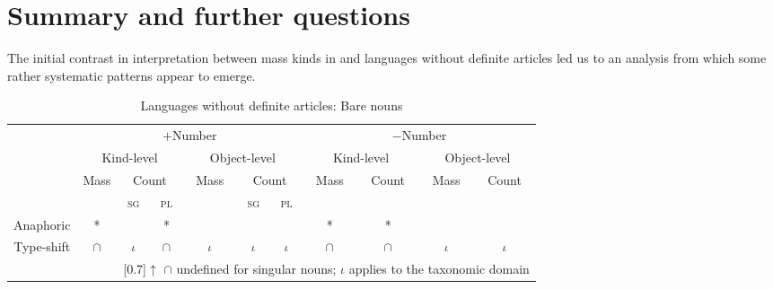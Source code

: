 \documentclass[output=paper,
modfonts
]{langscibook}
\begin{document}
	\section{Summary and further questions} \label{sec:despic:5} 
	
	The initial contrast in interpretation between mass kinds in  and languages without
	definite articles led us to an analysis from which some rather systematic patterns appear to emerge.
	
	\begin{table} 
		\caption{Languages without definite articles: Bare nouns}
		\begin{tabular}{c|c|c|c|c|c|c|c|c|c|c|}
			\cline{2-11}
			& \multicolumn{6}{|c|}{$+${\footnotesize Number}} & \multicolumn{4}{|c|}{$-${\footnotesize Number}} \\
			\cline{2-11}
			& 
			\multicolumn{3}{|c|}{{{\footnotesize Kind-level}}} & \multicolumn{3}{|c|}{{{\footnotesize Object-level}}} & \multicolumn{2}{|c|}{{{\footnotesize Kind-level}}} & \multicolumn{2}{|c|}{{{\footnotesize Object-level}}} \\
			\cline{2-11}
			& \footnotesize Mass & \multicolumn{2}{|c|}{\footnotesize Count} & \footnotesize Mass & \multicolumn{2}{|c|}{\footnotesize Count} & \footnotesize Mass & \footnotesize Count & \footnotesize Mass & \footnotesize Count \\
			\cline{2-11}
			& \cellcolor{lightgray} & \cellcolor{gray}\textsc{sg} & \textsc{pl} & \cellcolor{lightgray} & \textsc{sg} & \textsc{pl} & \cellcolor{lightgray} & \cellcolor{lightgray} & \cellcolor{lightgray} & \cellcolor{lightgray} \\
			
			\hline
			\multicolumn{1}{|c|}{\footnotesize {Anaphoric}} & * & \cellcolor{gray}\checkmark & * & \checkmark & \checkmark & \checkmark & * & * & \checkmark & \checkmark \\
			
			\hline
			\multicolumn{1}{|c|}{\footnotesize {Type-shift}} & $\cap$ & \cellcolor{gray}$\iota$ & $\cap$ & $\iota$  & $\iota$ & $\iota$ & $\cap$ & $\cap$ & $\iota$ & $\iota$ \\ \hline
			\multicolumn{2}{c}{} & \multicolumn{9}{l}{\scalebox{0.8}[0.7]{$\uparrow$} \footnotesize $\cap$ undefined for singular nouns; $\iota$ applies to the taxonomic domain
			}
		\end{tabular}
		\label{tab:despic:1}
	\end{table}
	
\end{document}
